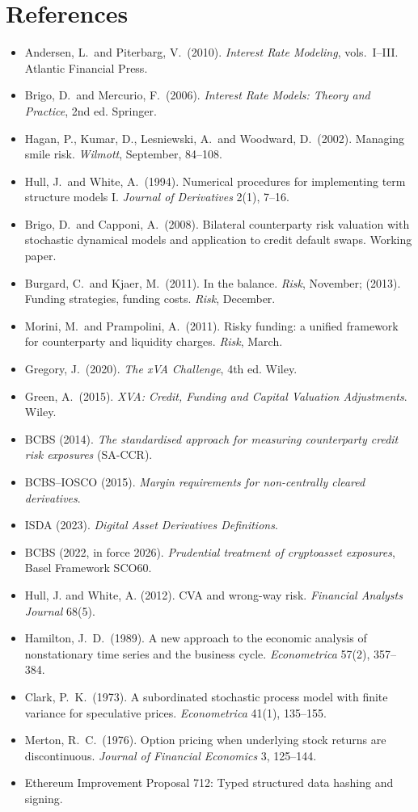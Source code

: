 \documentclass[11pt,a4paper]{article}
\let\plainsection\section
\renewcommand{\section}{\needspace{9\baselineskip}\plainsection}
\begin{document}
\section*{References}
\begin{itemize}[leftmargin=1.4em]
\item Andersen, L.\ and Piterbarg, V.\ (2010). \emph{Interest Rate Modeling}, vols.\ I--III. Atlantic Financial Press.
\item Brigo, D.\ and Mercurio, F.\ (2006). \emph{Interest Rate Models: Theory and Practice}, 2nd ed. Springer.
\item Hagan, P., Kumar, D., Lesniewski, A.\ and Woodward, D.\ (2002). Managing smile risk. \emph{Wilmott}, September, 84--108.
\item Hull, J.\ and White, A.\ (1994). Numerical procedures for implementing term structure models I. \emph{Journal of Derivatives} 2(1), 7--16.
\item Brigo, D.\ and Capponi, A.\ (2008). Bilateral counterparty risk valuation with stochastic dynamical models and application to credit default swaps. Working paper.
\item Burgard, C.\ and Kjaer, M.\ (2011). In the balance. \emph{Risk}, November; (2013). Funding strategies, funding costs. \emph{Risk}, December.
\item Morini, M.\ and Prampolini, A.\ (2011). Risky funding: a unified framework for counterparty and liquidity charges. \emph{Risk}, March.
\item Gregory, J.\ (2020). \emph{The xVA Challenge}, 4th ed. Wiley.
\item Green, A.\ (2015). \emph{XVA: Credit, Funding and Capital Valuation Adjustments}. Wiley.
\item BCBS (2014). \emph{The standardised approach for measuring counterparty credit risk exposures} (SA-CCR).
\item BCBS--IOSCO (2015). \emph{Margin requirements for non-centrally cleared derivatives}.
\item ISDA (2023). \emph{Digital Asset Derivatives Definitions}.
\item BCBS (2022, in force 2026). \emph{Prudential treatment of cryptoasset exposures}, Basel Framework SCO60.
\item Hull, J. and White, A. (2012). CVA and wrong-way risk. \emph{Financial Analysts Journal} 68(5).
\item Hamilton, J.\ D.\ (1989). A new approach to the economic analysis of nonstationary time series and the business cycle. \emph{Econometrica} 57(2), 357--384.
\item Clark, P.\ K.\ (1973). A subordinated stochastic process model with finite variance for speculative prices. \emph{Econometrica} 41(1), 135--155.
\item Merton, R.\ C.\ (1976). Option pricing when underlying stock returns are discontinuous. \emph{Journal of Financial Economics} 3, 125--144.
\item Ethereum Improvement Proposal 712: Typed structured data hashing and signing.
\end{itemize}
\end{document}
